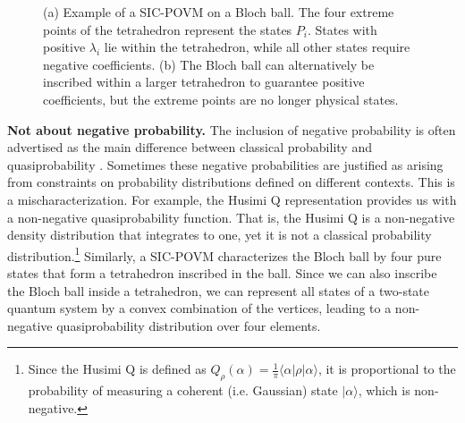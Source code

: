 \documentclass[10pt,twocolumn, nofootinbib]{revtex4-2}
\begin{document}
\begin{figure}[H]
\begin{subfigure}[c]{0.23\textwidth}
		\caption{}
	\end{subfigure}
	\caption{(a) Example of a SIC-POVM on a Bloch ball. The four extreme points of the tetrahedron represent the states $P_i$. States with positive $\lambda_i$ lie within the tetrahedron, while all other states require negative coefficients. (b) The Bloch ball can alternatively be inscribed within a larger tetrahedron to guarantee positive coefficients, but the extreme points are no longer physical states.}\label{SIC}
\end{figure}


\textbf{Not about negative probability.} The inclusion of negative probability is often advertised as the main difference between classical probability and quasiprobability \cite{adhikary2020}. Sometimes these negative probabilities are justified as arising from constraints on probability distributions defined on different contexts. This is a mischaracterization. For example, the Husimi Q representation provides us with a non-negative quasiprobability function. That is, the Husimi Q is a non-negative density distribution that integrates to one, yet it is not a classical probability distribution.\footnote{Since the Husimi Q is defined as $Q_{\rho} ( \alpha ) = \frac{1}{\pi} \langle \alpha | \rho | \alpha \rangle$, it is proportional to the probability of measuring a coherent (i.e. Gaussian) state $| \alpha \rangle$, which is non-negative. } Similarly, a SIC-POVM characterizes the Bloch ball by four pure states that form a tetrahedron inscribed in the ball. Since we can also inscribe the Bloch ball inside a tetrahedron, we can represent all states of a two-state quantum system by a convex combination of the vertices, leading to a non-negative quasiprobability distribution over four elements.
\end{document}
